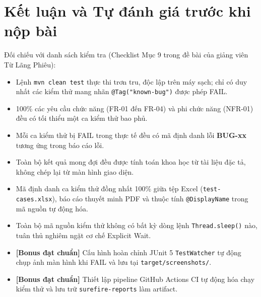 \documentclass[a4paper]{article}
\begin{document}
\clearpage
\section{Kết luận và Tự đánh giá trước khi nộp bài}
Đối chiếu với danh sách kiểm tra (Checklist Mục 9 trong đề bài của giảng viên Từ Lãng Phiêu):
\begin{itemize}
  \item[\checkmark] Lệnh \texttt{mvn clean test} thực thi trơn tru, độc lập trên máy sạch; chỉ có duy nhất các kiểm thử mang nhãn \texttt{@Tag("known-bug")} được phép FAIL.
  \item[\checkmark] 100\% các yêu cầu chức năng (FR-01 đến FR-04) và phi chức năng (NFR-01) đều có tối thiểu một ca kiểm thử bao phủ.
  \item[\checkmark] Mỗi ca kiểm thử bị FAIL trong thực tế đều có mã định danh lỗi \textbf{BUG-xx} tương ứng trong báo cáo lỗi.
  \item[\checkmark] Toàn bộ kết quả mong đợi đều được tính toán khoa học từ tài liệu đặc tả, không chép lại từ màn hình giao diện.
  \item[\checkmark] Mã định danh ca kiểm thử đồng nhất 100\% giữa tệp Excel (\texttt{test-cases.xlsx}), báo cáo thuyết minh PDF và thuộc tính \texttt{@DisplayName} trong mã nguồn tự động hóa.
  \item[\checkmark] Toàn bộ mã nguồn kiểm thử không có bất kỳ dòng lệnh \texttt{Thread.sleep()} nào, tuân thủ nghiêm ngặt cơ chế Explicit Wait.
  \item[\checkmark] \textbf{[Bonus đạt chuẩn]} Cấu hình hoàn chỉnh JUnit 5 \texttt{TestWatcher} tự động chụp ảnh màn hình khi FAIL và lưu tại \texttt{target/screenshots/}.
  \item[\checkmark] \textbf{[Bonus đạt chuẩn]} Thiết lập pipeline GitHub Actions CI tự động hóa chạy kiểm thử và lưu trữ \texttt{surefire-reports} làm artifact.
\end{itemize}
\end{document}
